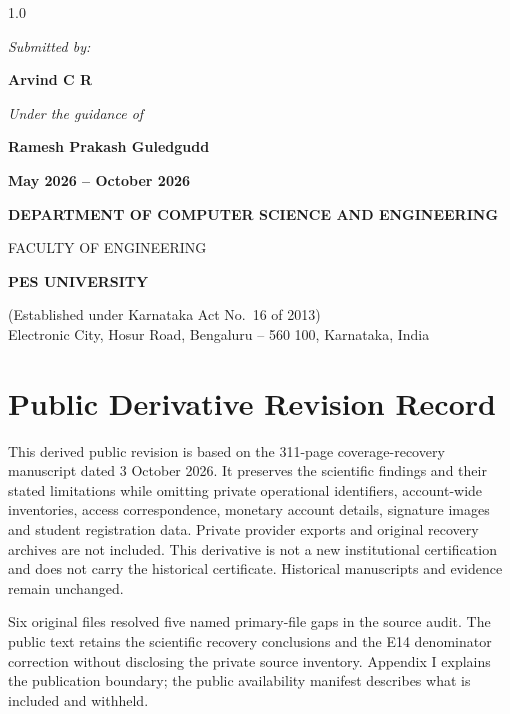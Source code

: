 \documentclass[12pt,a4paper]{report}
\begin{document}
\begin{titlepage}
\begin{spacing}{1.0}
{\normalsize\itshape Submitted by:\par}
\vspace{0.3em}
{\large\bfseries Arvind C R\par}

\vspace{0.5em}
{\normalsize\itshape Under the guidance of\par}
\vspace{0.2em}
{\large\bfseries Ramesh Prakash Guledgudd\par}

\vspace{0.6em}
{\normalsize\bfseries\color{pesmaroon} May 2026 -- October 2026\par}

\vfill

{\normalsize\bfseries DEPARTMENT OF COMPUTER SCIENCE AND ENGINEERING\par}
{\normalsize FACULTY OF ENGINEERING\par}
{\large\bfseries PES UNIVERSITY\par}
{\footnotesize (Established under Karnataka Act No.\ 16 of 2013)\\
Electronic City, Hosur Road, Bengaluru -- 560 100, Karnataka, India\par}
\end{spacing}
\end{titlepage}



\chapter*{Public Derivative Revision Record}
This derived public revision is based on the 311-page coverage-recovery manuscript dated 3 October 2026. It preserves the scientific findings and their stated limitations while omitting private operational identifiers, account-wide inventories, access correspondence, monetary account details, signature images and student registration data. Private provider exports and original recovery archives are not included. This derivative is not a new institutional certification and does not carry the historical certificate. Historical manuscripts and evidence remain unchanged.

Six original files resolved five named primary-file gaps in the source audit. The public text retains the scientific recovery conclusions and the E14 denominator correction without disclosing the private source inventory. Appendix I explains the publication boundary; the public availability manifest describes what is included and withheld.
\end{document}
